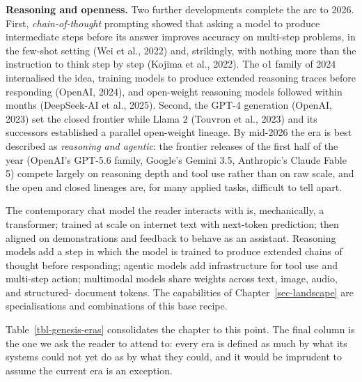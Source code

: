 \documentclass[
  letterpaper,
  11pt]{scrbook}
\begin{document}
\textbf{Reasoning and openness.} Two further developments complete the
arc to 2026. First, \emph{chain-of-thought} prompting showed that asking
a model to produce intermediate steps before its answer improves
accuracy on multi-step problems, in the few-shot setting (Wei et al.,
2022) and, strikingly, with nothing more than the instruction to think
step by step (Kojima et al., 2022). The o1 family of 2024 internalised
the idea, training models to produce extended reasoning traces before
responding (OpenAI, 2024), and open-weight reasoning models followed
within months ({DeepSeek-AI et al.}, 2025). Second, the GPT-4 generation
(OpenAI, 2023) set the closed frontier while Llama 2 ({Touvron et al.},
2023) and its successors established a parallel open-weight lineage. By
mid-2026 the era is best described as \emph{reasoning and agentic}: the
frontier releases of the first half of the year (OpenAI's GPT-5.6
family, Google's Gemini 3.5, Anthropic's Claude Fable 5) compete largely
on reasoning depth and tool use rather than on raw scale, and the open
and closed lineages are, for many applied tasks, difficult to tell
apart.

The contemporary chat model the reader interacts with is, mechanically,
a transformer; trained at scale on internet text with next-token
prediction; then aligned on demonstrations and feedback to behave as an
assistant. Reasoning models add a step in which the model is trained to
produce extended chains of thought before responding; agentic models add
infrastructure for tool use and multi-step action; multimodal models
share weights across text, image, audio, and structured- document
tokens. The capabilities of Chapter~\ref{sec-landscape} are
specialisations and combinations of this base recipe.

Table~\ref{tbl-genesis-eras} consolidates the chapter to this point. The
final column is the one we ask the reader to attend to: every era is
defined as much by what its systems could not yet do as by what they
could, and it would be imprudent to assume the current era is an
exception.
\end{document}
